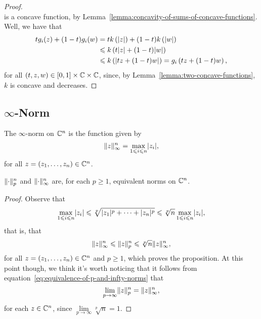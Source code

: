 \begin{proof}
\[  \]
  is a concave function, by
  Lemma~\ref{lemma:concavity-of-sums-of-concave-functions}. Well, we have that
  \begin{align*}
    tg_{i}(z)+(1-t)g_{i}(w)
    &=
    tk\left(\lvert z\rvert\right)+(1-t)k\left(\lvert w\rvert\right)
    \\
    &\leqslant
    k\left(t\lvert z\rvert+(1-t)\lvert w\rvert\right)
    \\
    &\leqslant
    k\left(\lvert tz+(1-t)w\rvert\right)
    =
    g_{i}\left(tz+(1-t)w\right),
  \end{align*}
  for all \((t,z,w)\in{[0,1]\times\mathbb{C}\times\mathbb{C}}\), since,
  by Lemma~\ref{lemma:two-concave-functions}, \(k\) is concave and decreases.
\end{proof}

\subsection{\(\infty\)-Norm}\label{subsec:infty-norm}

\begin{definition}
  The \(\infty\)-norm on \(\mathbb{C}^{n}\) is the function given by
  \[
    \norm<n>[\infty](z)
    =
    \max\limits_{1\leqslant{i}\leqslant{n}}\abs{z_{i}},
  \]
  for all \(z=(z_{1},\ldots,z_{n})\in\mathbb{C}^{n}\).
\end{definition}

\begin{proposition}
  \(\norm<n>[p]\) and \(\norm<n>[\infty]\) are, for each \(p\geqslant{1}\),
  equivalent norms on \(\mathbb{C}^{n}\).
\end{proposition}

\begin{proof}
  Observe that
  \[
    \max\limits_{1\leqslant{i}\leqslant{n}}\lvert z_{i}\rvert
    \leqslant\sqrt[p]{\lvert z_{1}\rvert^{p}+\cdots+\lvert z_{n}\rvert^{p}}
    \leqslant\sqrt[p]{n}\max\limits_{1\leqslant{i}\leqslant{n}}\lvert z_{i}\rvert,
  \]
  that is, that
  \begin{equation}\label{eq:equivalence-of-p-and-infty-norms}
    \norm<n>[\infty](z)
    \leqslant
    \norm<n>[p](z)
    \leqslant
    \sqrt[p]{n}\norm<n>[\infty](z),
  \end{equation}
  for all \(z=(z_{1},\ldots,z_{n})\in\mathbb{C}^{n}\) and \(p\geqslant{1}\),
  which proves the proposition. At this point though, we think it's worth
  noticing that it follows from
  equation~\eqref{eq:equivalence-of-p-and-infty-norms} that
  \[
    \lim\limits_{p\to\infty}\norm<n>[p](z)=\norm<n>[\infty](z),
  \]
  for each \(z\in\mathbb{C}^{n}\), since
  \(\lim\limits_{p\to\infty}\sqrt[p]{n}=1\).
\end{proof}

